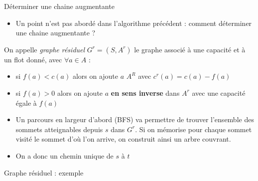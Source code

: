\begin{frame}{Déterminer une chaine augmentante}
    \begin{itemize}
        \item Un point n'est pas abordé dans l'algorithme précédent : comment déterminer une chaine augmentante ?
    \end{itemize}
    \begin{definition}
        On appelle \emph{graphe résiduel} $G^r=(S,A^r)$ le graphe associé à une capacité et à un flot donné, avec $\forall a \in A$ :
        \begin{itemize}
            \item si $f(a) < c(a)$ alors on ajoute $a$  $A^R$ avec $c^r(a) = c(a)-f(a)$
            \item si $f(a) > 0$ alors on ajoute $a$ \textbf{en sens inverse} dans $A^r$ avec une capacité égale à $f(a)$
        \end{itemize}
    \end{definition}
    \begin{itemize}
    \item Un parcours en largeur d'abord (BFS) va permettre de trouver l'ensemble des sommets atteignables depuis $s$ dans $G^r$. Si on mémorise pour chaque sommet visité le sommet d'où l'on arrive, on construit ainsi un arbre couvrant. 
    \item On a donc un chemin unique de $s$ à $t$ 
\end{itemize}
\end{frame}


\begin{frame}{Graphe résiduel : exemple}
\begin{center}
    \scalebox{0.65}{} 
    \scalebox{0.65}{}
\end{center}
\end{frame} 


